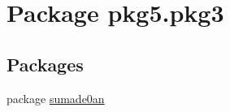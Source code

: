 \hypertarget{namespacepkg5_1_1pkg3}{}\section{Package pkg5.\+pkg3}
\label{namespacepkg5_1_1pkg3}
\subsection*{Packages}
\begin{DoxyCompactItemize}
\item 
package \mbox{\hyperlink{namespacepkg5_1_1pkg3_1_1sumade0an}{sumade0an}}
\end{DoxyCompactItemize}

